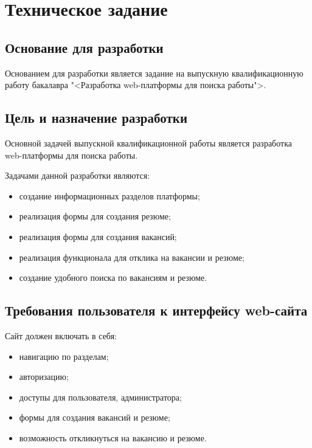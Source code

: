 \section{Техническое задание}
\subsection{Основание для разработки}

Основанием для разработки является задание на выпускную квалификационную работу бакалавра "<Разработка web-платформы для поиска работы">.

\subsection{Цель и назначение разработки}

Основной задачей выпускной квалификационной работы является разработка  web-платформы для поиска работы.

Задачами данной разработки являются:
\begin{itemize}
\item создание информационных разделов платформы;
\item реализация формы для создания резюме;
\item реализация формы для создания вакансий;
\item реализация функционала для отклика на вакансии и резюме;
\item создание удобного поиска по вакансиям и резюме.
\end{itemize}

\subsection{Требования пользователя к интерфейсу web-сайта}

Сайт должен включать в себя:
\begin{itemize}
    \item навигацию по разделам;
    \item авторизацию;
    \item доступы для пользователя, администратора;
    \item формы для создания вакансий и резюме;
    \item возможность откликнуться на вакансию и резюме.
\end{itemize}


